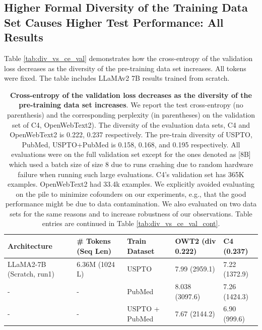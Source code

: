 \documentclass[10pt]{article} %
\begin{document}
\subsection{Higher Formal Diversity of the Training Data Set Causes Higher Test Performance: All Results}
Table \ref{tab:div_vs_ce_val} demonstrates how the cross-entropy of the validation loss decreases as the diversity of the pre-training data set increases. 
All tokens were fixed. 
The table includes LLaMAv2 7B results trained from scratch.

\begin{table}[h]
\caption{\textbf{Cross-entropy of the validation loss decreases as the diversity of the pre-training data set increases}. 
We report the test cross-entropy (no parenthesis) and the corresponding perplexity (in parentheses) on the validation set of C4, OpenWebText2).
The diversity of the evaluation data sets, C4 and OpenWebText2 is 0.222, 0.237 respectively. 
The pre-train diversity of USPTO, PubMed, USPTO+PubMed is 0.158, 0.168, and 0.195 respectively.
All evaluations were on the full validation set except for the ones denoted as [8B] which used a batch size of size 8 due to runs crashing due to random hardware failure when running such large evaluations. 
C4's validation set has 365K examples. 
OpenWebText2 had 33.4k examples. 
We explicitly avoided evaluating on the pile to minimize cofounders on our experiments, e.g., that the good performance might be due to data contamination. 
We also evaluated on two data sets for the same reasons and to increase robustness of our observations. Table entries are continued in Table \ref{tab:div_vs_ce_val_cont}.
}
\vspace{10pt}
\centering
\begin{tabularx}{1\textwidth}{lXXXX} 
\bottomrule 
Architecture & \# Tokens (Seq Len) & Train Dataset  & OWT2 (\textbf{div 0.222})  & C4 (\textbf{0.237}) \\
\bottomrule 

LLaMA2-7B (Scratch, run1) & 6.36M (1024 L) & USPTO  & 7.99 (2959.1) & 7.22 (1372.9) \\ %
- & - & PubMed & 8.038 (3097.6) & 7.26 (1424.3) \\ %
- & - & USPTO + PubMed & 7.67 (2144.2) & 6.90 (999.6) \\ %
\hline


\end{tabularx}
\end{table}
\end{document}
